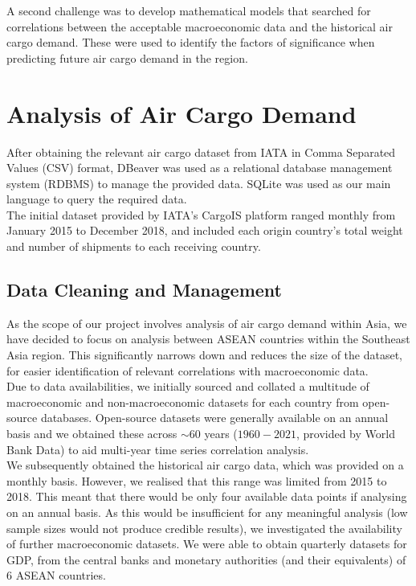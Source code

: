 \documentclass{article}
\begin{document}
\noindent A second challenge was to develop mathematical models that searched for correlations between the acceptable macroeconomic data and the historical air cargo demand. These were used to identify the factors of significance when predicting future air cargo demand in the region. 

\section{Analysis of Air Cargo Demand}

After obtaining the relevant air cargo dataset from IATA in Comma Separated Values (CSV) format, DBeaver was used as a relational database management system (RDBMS) to manage the provided data. SQLite was used as our main language to query the required data. \\

\noindent The initial dataset provided by IATA's CargoIS platform ranged monthly from January 2015 to December 2018, and included each origin country's total weight and number of shipments to each receiving country.


\subsection{Data Cleaning and Management}

As the scope of our project involves analysis of air cargo demand within Asia, we have decided to focus on analysis between ASEAN countries within the Southeast Asia region. This significantly narrows down and reduces the size of the dataset, for easier identification of relevant correlations with macroeconomic data. \\

\noindent Due to data availabilities, we initially sourced and collated a multitude of macroeconomic and non-macroeconomic datasets for each country from open-source databases. Open-source datasets were generally available on an annual basis and we obtained these across $\sim60$ years ($1960 - 2021$, provided by World Bank Data) to aid multi-year time series correlation analysis. \\

\noindent We subsequently obtained the historical air cargo data, which was provided on a monthly basis. However, we realised that this range was limited from 2015 to 2018. This meant that there would be only four available data points if analysing on an annual basis. As this would be insufficient for any meaningful analysis (low sample sizes would not produce credible results), we investigated the availability of further macroeconomic datasets. We were able to obtain quarterly datasets for GDP, from the central banks and monetary authorities (and their equivalents) of 6 ASEAN countries. \\
\end{document}
